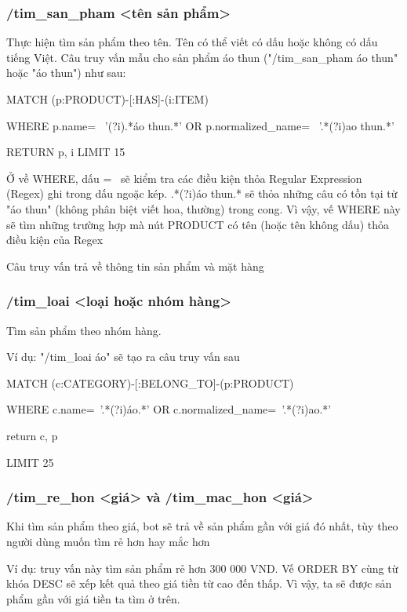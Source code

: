 \subsubsection{/tim\_san\_pham <tên sản phẩm>}
Thực hiện tìm sản phẩm theo tên. Tên có thể viết có dấu hoặc không có dấu tiếng Việt. 
Câu truy vấn mẫu cho sản phẩm áo thun ("/tim\_san\_pham áo thun" hoặc "áo thun") như sau: 

\smallskip

MATCH (p:PRODUCT)-[:HAS]-(i:ITEM) 

WHERE p.name=~ '(?i).*áo thun.*' OR p.normalized\_name=~ '.*(?i)ao thun.*' 

RETURN p, i LIMIT 15

\smallskip

Ở về WHERE, dấu =~ sẽ kiểm tra các điều kiện thỏa Regular Expression (Regex) ghi trong dấu ngoặc kép. 
.*(?i)áo thun.* sẽ thỏa những câu có tồn tại từ "áo thun" (không phân biệt viết hoa, thường) trong cong. Vì vậy, vế WHERE này sẽ tìm những trường hợp mà nút PRODUCT có tên (hoặc tên không dấu) thỏa điều kiện của Regex  

Câu truy vấn trả về thông tin sản phẩm và mặt hàng 

\subsubsection{/tim\_loai <loại hoặc nhóm hàng> }

Tìm sản phẩm theo nhóm hàng.

Ví dụ: "/tim\_loai áo" sẽ tạo ra câu truy vấn sau
 
MATCH (c:CATEGORY)-[:BELONG\_TO]-(p:PRODUCT)

WHERE c.name=~'.*(?i)áo.*' OR c.normalized\_name=~'.*(?i)ao.*'  

return c, p

LIMIT 25

\smallskip

\subsubsection{/tim\_re\_hon <giá> và /tim\_mac\_hon <giá>}

Khi tìm sản phẩm theo giá, bot sẽ trả về sản phẩm gần với giá đó nhất, tùy theo người dùng muốn tìm rẻ hơn hay mắc hơn 

Ví dụ: truy vấn này tìm sản phẩm rẻ hơn 300 000 VND. Vế ORDER BY cùng từ khóa DESC sẽ xếp kết quả theo giá tiền từ cao đến thấp. Vì vậy, ta sẽ được sản phẩm gần với giá tiền ta tìm ở trên. 

